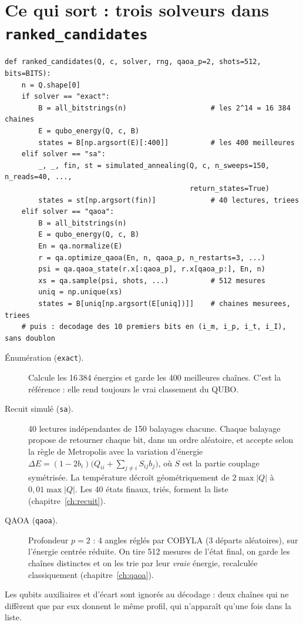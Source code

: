 \section{Ce qui sort : trois solveurs dans \texttt{ranked\_candidates}}
\begin{lstlisting}
def ranked_candidates(Q, c, solver, rng, qaoa_p=2, shots=512, bits=BITS):
    n = Q.shape[0]
    if solver == "exact":
        B = all_bitstrings(n)                    # les 2^14 = 16 384 chaines
        E = qubo_energy(Q, c, B)
        states = B[np.argsort(E)[:400]]          # les 400 meilleures
    elif solver == "sa":
        _, _, fin, st = simulated_annealing(Q, c, n_sweeps=150, n_reads=40, ...,
                                            return_states=True)
        states = st[np.argsort(fin)]             # 40 lectures, triees
    elif solver == "qaoa":
        B = all_bitstrings(n)
        E = qubo_energy(Q, c, B)
        En = qa.normalize(E)
        r = qa.optimize_qaoa(En, n, qaoa_p, n_restarts=3, ...)
        psi = qa.qaoa_state(r.x[:qaoa_p], r.x[qaoa_p:], En, n)
        xs = qa.sample(psi, shots, ...)          # 512 mesures
        uniq = np.unique(xs)
        states = B[uniq[np.argsort(E[uniq])]]    # chaines mesurees, triees
    # puis : decodage des 10 premiers bits en (i_m, i_p, i_t, i_I), sans doublon
\end{lstlisting}

\begin{description}
\item[Énumération (\texttt{exact}).] Calcule les 16\,384 énergies et garde les 400 meilleures chaînes. C'est la référence : elle rend toujours le vrai classement du QUBO.
\item[Recuit simulé (\texttt{sa}).] 40 lectures indépendantes de 150 balayages chacune. Chaque balayage propose de retourner chaque bit, dans un ordre aléatoire, et accepte selon la règle de Metropolis avec la variation d'énergie $\Delta E=(1-2b_i)\big(Q_{ii}+\sum_{j\ne i}S_{ij}b_j\big)$, où $S$ est la partie couplage symétrisée. La température décroît géométriquement de $2\max|Q|$ à $0{,}01\max|Q|$. Les 40 états finaux, triés, forment la liste (chapitre~\ref{ch:recuit}).
\item[QAOA (\texttt{qaoa}).] Profondeur $p=2$ : 4 angles réglés par COBYLA (3 départs aléatoires), sur l'énergie centrée réduite. On tire 512 mesures de l'état final, on garde les chaînes distinctes et on les trie par leur \emph{vraie} énergie, recalculée classiquement (chapitre~\ref{ch:qaoa}).
\end{description}
Les qubits auxiliaires et d'écart sont ignorés au décodage : deux chaînes qui ne diffèrent que par eux donnent le même profil, qui n'apparaît qu'une fois dans la liste.

